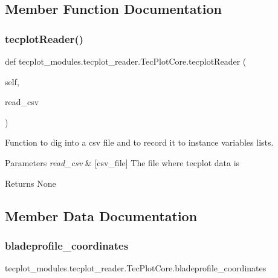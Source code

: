\subsection{Member Function Documentation}
\hypertarget{a00118_a9cf438934b57cd1d0bef90bcc00f27ac}{}\label{a00118_a9cf438934b57cd1d0bef90bcc00f27ac} 
\subsubsection{\texorpdfstring{tecplot\+Reader()}{tecplotReader()}}
{\footnotesize\ttfamily def tecplot\+\_\+modules.\+tecplot\+\_\+reader.\+Tec\+Plot\+Core.\+tecplot\+Reader (\begin{DoxyParamCaption}\item[{}]{self,  }\item[{}]{read\+\_\+csv }\end{DoxyParamCaption})}



Function to dig into a csv file and to record it to instance variables lists. 


\begin{DoxyParams}{Parameters}
{\em read\+\_\+csv} & \mbox{[}csv\+\_\+file\mbox{]} The file where tecplot data is \\
\hline
\end{DoxyParams}
\begin{DoxyReturn}{Returns}
None 
\end{DoxyReturn}


\subsection{Member Data Documentation}
\hypertarget{a00118_abd9898f018cbb1686522d50721f851a7}{}\label{a00118_abd9898f018cbb1686522d50721f851a7} 
\subsubsection{\texorpdfstring{bladeprofile\+\_\+coordinates}{bladeprofile\_coordinates}}
{\footnotesize\ttfamily tecplot\+\_\+modules.\+tecplot\+\_\+reader.\+Tec\+Plot\+Core.\+bladeprofile\+\_\+coordinates}

